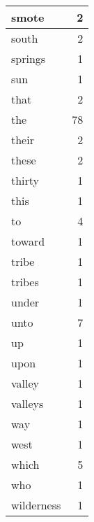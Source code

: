 \begin{center}
\begin{longtable}{l|r}
smote & 2 \\ \hline
south & 2 \\ \hline
springs & 1 \\ \hline
sun & 1 \\ \hline
that & 2 \\ \hline
the & 78 \\ \hline
their & 2 \\ \hline
these & 2 \\ \hline
thirty & 1 \\ \hline
this & 1 \\ \hline
to & 4 \\ \hline
toward & 1 \\ \hline
tribe & 1 \\ \hline
tribes & 1 \\ \hline
under & 1 \\ \hline
unto & 7 \\ \hline
up & 1 \\ \hline
upon & 1 \\ \hline
valley & 1 \\ \hline
valleys & 1 \\ \hline
way & 1 \\ \hline
west & 1 \\ \hline
which & 5 \\ \hline
who & 1 \\ \hline
wilderness & 1 \\ \hline
\end{longtable}
\end{center}



\normalsize



